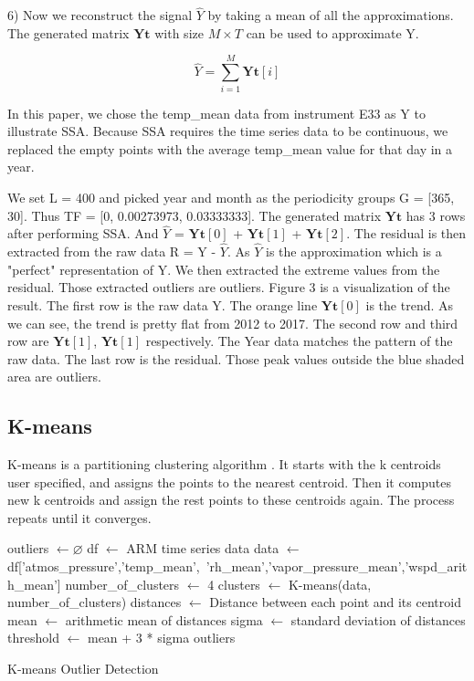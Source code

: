 \documentclass[letterpaper, 10 pt, conference]{ieeeconf}  %
\begin{document}
6) Now we reconstruct the signal $\hat{Y}$ by taking a mean of all the approximations. The generated matrix $\mathbf{Yt}$ with size $M \times T$ can be used to approximate Y.

\begin{equation}
\hat{Y} =  \displaystyle\sum_{i=1}^{M} \mathbf{Yt}[i]
\end{equation}

In this paper, we chose the temp\_mean data from instrument E33 as Y to illustrate SSA. Because SSA requires the time series data to be continuous, we replaced the empty points with the average temp\_mean value for that day in a year. 

We set L = 400 and picked year and month as the periodicity groups G = [365, 30]. Thus TF = [0, 0.00273973, 0.03333333]. The generated matrix $\mathbf{Yt}$ has 3 rows after performing SSA. And $\hat{Y}$ = $\mathbf{Yt}[0]$ + $\mathbf{Yt}[1]$ + $\mathbf{Yt}[2]$. The residual is then extracted from the raw data R = Y - $\hat{Y}$. As $\hat{Y}$ is the approximation which is a "perfect" representation of Y. We then extracted the extreme values from the residual. Those extracted outliers are outliers. Figure 3 is a visualization of the result. The first row is the raw data Y. The orange line $\mathbf{Yt}[0]$ is the trend. As we can see, the trend is pretty flat from 2012 to 2017. The second row and third row are $\mathbf{Yt}[1]$, $\mathbf{Yt}[1]$ respectively. The Year data matches the pattern of the raw data. The last row is the residual. Those peak values outside the blue shaded area are outliers.

\subsection{K-means}
K-means is a partitioning clustering algorithm \cite{macqueen1967some, hartigan1979algorithm}. It starts with the k centroids user specified, and assigns the points to the nearest centroid. Then it computes new k centroids and assign the rest points to these centroids again. The process repeats until it converges. 

\begin{algorithm}[ht]
\DontPrintSemicolon
\SetAlgoLined
\BlankLine

outliers $\leftarrow \varnothing$\;
df $\leftarrow$ ARM time series data\;
data $\leftarrow$ df['atmos\_pressure','temp\_mean',\
'rh\_mean','vapor\_pressure\_mean','wspd\_arith\_mean']\;
number\_of\_clusters $\leftarrow$ 4\;
clusters $\leftarrow$ K-means(data, number\_of\_clusters)\;
distances $\leftarrow$ Distance between each point and its centroid\;
mean $\leftarrow$ arithmetic mean of distances\;
sigma $\leftarrow$ standard deviation of distances\;
threshold $\leftarrow$ mean + 3 * sigma\;
\Return outliers
\caption{K-means Outlier Detection}
\end{algorithm}
\end{document}
